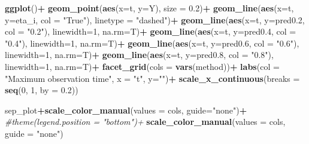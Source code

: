 \documentclass[
]{article}
\newenvironment{Shaded}{\begin{snugshade}}{\end{snugshade}}
\newcommand{\AttributeTok}[1]{\textcolor[rgb]{0.13,0.29,0.53}{#1}}
\newcommand{\CommentTok}[1]{\textcolor[rgb]{0.56,0.35,0.01}{\textit{#1}}}
\newcommand{\DecValTok}[1]{\textcolor[rgb]{0.00,0.00,0.81}{#1}}
\newcommand{\FloatTok}[1]{\textcolor[rgb]{0.00,0.00,0.81}{#1}}
\newcommand{\FunctionTok}[1]{\textcolor[rgb]{0.13,0.29,0.53}{\textbf{#1}}}
\newcommand{\NormalTok}[1]{#1}
\newcommand{\SpecialCharTok}[1]{\textcolor[rgb]{0.81,0.36,0.00}{\textbf{#1}}}
\newcommand{\StringTok}[1]{\textcolor[rgb]{0.31,0.60,0.02}{#1}}
\begin{document}
\begin{Shaded}
\begin{Highlighting}[]
  \FunctionTok{ggplot}\NormalTok{()}\SpecialCharTok{+}
  \FunctionTok{geom\_point}\NormalTok{(}\FunctionTok{aes}\NormalTok{(}\AttributeTok{x=}\NormalTok{t, }\AttributeTok{y=}\NormalTok{Y), }\AttributeTok{size =} \FloatTok{0.2}\NormalTok{)}\SpecialCharTok{+}
  \FunctionTok{geom\_line}\NormalTok{(}\FunctionTok{aes}\NormalTok{(}\AttributeTok{x=}\NormalTok{t, }\AttributeTok{y=}\NormalTok{eta\_i, }\AttributeTok{col =} \StringTok{"True"}\NormalTok{), }\AttributeTok{linetype =} \StringTok{"dashed"}\NormalTok{)}\SpecialCharTok{+}
  \FunctionTok{geom\_line}\NormalTok{(}\FunctionTok{aes}\NormalTok{(}\AttributeTok{x=}\NormalTok{t, }\AttributeTok{y=}\NormalTok{pred0}\FloatTok{.2}\NormalTok{, }\AttributeTok{col =} \StringTok{"0.2"}\NormalTok{), }\AttributeTok{linewidth=}\DecValTok{1}\NormalTok{, }\AttributeTok{na.rm=}\NormalTok{T)}\SpecialCharTok{+}
  \FunctionTok{geom\_line}\NormalTok{(}\FunctionTok{aes}\NormalTok{(}\AttributeTok{x=}\NormalTok{t, }\AttributeTok{y=}\NormalTok{pred0}\FloatTok{.4}\NormalTok{, }\AttributeTok{col =} \StringTok{"0.4"}\NormalTok{), }\AttributeTok{linewidth=}\DecValTok{1}\NormalTok{, }\AttributeTok{na.rm=}\NormalTok{T)}\SpecialCharTok{+}
  \FunctionTok{geom\_line}\NormalTok{(}\FunctionTok{aes}\NormalTok{(}\AttributeTok{x=}\NormalTok{t, }\AttributeTok{y=}\NormalTok{pred0}\FloatTok{.6}\NormalTok{, }\AttributeTok{col =} \StringTok{"0.6"}\NormalTok{), }\AttributeTok{linewidth=}\DecValTok{1}\NormalTok{, }\AttributeTok{na.rm=}\NormalTok{T)}\SpecialCharTok{+}
  \FunctionTok{geom\_line}\NormalTok{(}\FunctionTok{aes}\NormalTok{(}\AttributeTok{x=}\NormalTok{t, }\AttributeTok{y=}\NormalTok{pred0}\FloatTok{.8}\NormalTok{, }\AttributeTok{col =} \StringTok{"0.8"}\NormalTok{), }\AttributeTok{linewidth=}\DecValTok{1}\NormalTok{, }\AttributeTok{na.rm=}\NormalTok{T)}\SpecialCharTok{+}
  \FunctionTok{facet\_grid}\NormalTok{(}\AttributeTok{cols =} \FunctionTok{vars}\NormalTok{(method))}\SpecialCharTok{+}
  \FunctionTok{labs}\NormalTok{(}\AttributeTok{col =} \StringTok{"Maximum observation time"}\NormalTok{, }\AttributeTok{x =} \StringTok{"t"}\NormalTok{, }\AttributeTok{y=}\StringTok{""}\NormalTok{)}\SpecialCharTok{+}
  \FunctionTok{scale\_x\_continuous}\NormalTok{(}\AttributeTok{breaks =} \FunctionTok{seq}\NormalTok{(}\DecValTok{0}\NormalTok{, }\DecValTok{1}\NormalTok{, }\AttributeTok{by =} \FloatTok{0.2}\NormalTok{))}
\end{Highlighting}
\end{Shaded}

\begin{Shaded}
\begin{Highlighting}[]
\NormalTok{sep\_plot}\SpecialCharTok{+}\FunctionTok{scale\_color\_manual}\NormalTok{(}\AttributeTok{values =}\NormalTok{ cols, }\AttributeTok{guide=}\StringTok{"none"}\NormalTok{)}\SpecialCharTok{+}
  \CommentTok{\#theme(legend.position = "bottom")+}
  \FunctionTok{scale\_color\_manual}\NormalTok{(}\AttributeTok{values =}\NormalTok{ cols, }\AttributeTok{guide =} \StringTok{"none"}\NormalTok{)}
\end{Highlighting}
\end{Shaded}
\end{document}
